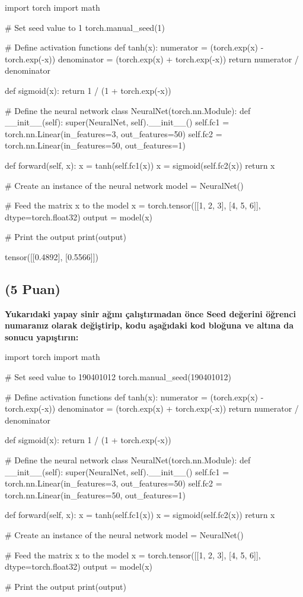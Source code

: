 \documentclass[11pt]{article}
\begin{document}
\begin{python}
import torch
import math

# Set seed value to 1
torch.manual_seed(1)

# Define activation functions
def tanh(x):
    numerator = (torch.exp(x) - torch.exp(-x))
    denominator = (torch.exp(x) + torch.exp(-x))
    return numerator / denominator

def sigmoid(x):
    return 1 / (1 + torch.exp(-x))

# Define the neural network
class NeuralNet(torch.nn.Module):
    def __init__(self):
        super(NeuralNet, self).__init__()
        self.fc1 = torch.nn.Linear(in_features=3, out_features=50)
        self.fc2 = torch.nn.Linear(in_features=50, out_features=1)

    def forward(self, x):
        x = tanh(self.fc1(x))
        x = sigmoid(self.fc2(x))
        return x

# Create an instance of the neural network
model = NeuralNet()

# Feed the matrix x to the model
x = torch.tensor([[1, 2, 3], [4, 5, 6]], dtype=torch.float32)
output = model(x)

# Print the output
print(output)

\end{python}

tensor([[0.4892],
        [0.5566]])
\clearpage
\subsection{(5 Puan)} \textbf{Yukarıdaki yapay sinir ağını çalıştırmadan önce Seed değerini öğrenci numaranız olarak değiştirip, kodu aşağıdaki kod bloğuna ve altına da sonucu yapıştırın:}

\begin{python}
import torch
import math

# Set seed value to 190401012
torch.manual_seed(190401012)

# Define activation functions
def tanh(x):
    numerator = (torch.exp(x) - torch.exp(-x))
    denominator = (torch.exp(x) + torch.exp(-x))
    return numerator / denominator

def sigmoid(x):
    return 1 / (1 + torch.exp(-x))

# Define the neural network
class NeuralNet(torch.nn.Module):
    def __init__(self):
        super(NeuralNet, self).__init__()
        self.fc1 = torch.nn.Linear(in_features=3, out_features=50)
        self.fc2 = torch.nn.Linear(in_features=50, out_features=1)

    def forward(self, x):
        x = tanh(self.fc1(x))
        x = sigmoid(self.fc2(x))
        return x

# Create an instance of the neural network
model = NeuralNet()

# Feed the matrix x to the model
x = torch.tensor([[1, 2, 3], [4, 5, 6]], dtype=torch.float32)
output = model(x)

# Print the output
print(output)

\end{python}
\end{document}
